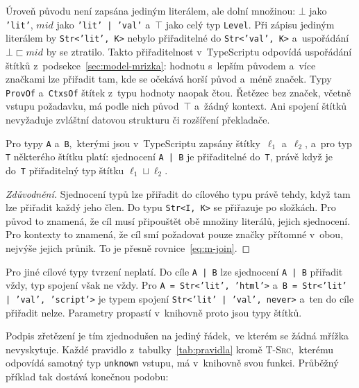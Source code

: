 \noindent
Úroveň původu není zapsána jediným literálem, ale dolní množinou: $\bot$ jako \texttt{'lit'}, $\mathit{mid}$ jako \texttt{'lit' | 'val'} a~$\top$ jako celý typ \texttt{Level}. Při zápisu jediným literálem by \texttt{Str<'lit', K>} nebylo přiřaditelné do \texttt{Str<'val', K>} a~uspořádání $\bot \sqsubset \mathit{mid}$ by se ztratilo. Takto přiřaditelnost v~TypeScriptu odpovídá uspořádání štítků z~podsekce~\ref{sec:model-mrizka}: hodnotu s~lepším původem a~více značkami lze přiřadit tam, kde se očekává horší původ a~méně značek. Typy \texttt{ProvOf} a~\texttt{CtxsOf} štítek z~typu hodnoty naopak čtou. Řetězec bez značek, včetně vstupu požadavku, má podle nich původ~$\top$ a~žádný kontext. Ani spojení štítků nevyžaduje zvláštní datovou strukturu či rozšíření překladače.

\begin{tvrzeni}
\label{claim:join}
Pro typy \texttt{A} a~\texttt{B},~kterými jsou v~TypeScriptu zapsány štítky~$\ell_1$ a~$\ell_2$, a~pro typ \texttt{T} některého štítku platí: sjednocení \texttt{A | B} je přiřaditelné do~\texttt{T}, právě když je do~\texttt{T} přiřaditelný typ štítku $\ell_1 \sqcup \ell_2$.
\end{tvrzeni}

\begin{proof}[Zdůvodnění]
Sjednocení typů lze přiřadit do cílového typu právě tehdy, když tam lze přiřadit každý jeho člen. Do typu \texttt{Str<I, K>} se přiřazuje po složkách. Pro původ to znamená, že cíl musí připouštět obě množiny literálů, jejich sjednocení. Pro kontexty to znamená, že cíl smí požadovat pouze značky přítomné v~obou, nejvýše jejich průnik. To je přesně rovnice~\ref{eq:m-join}.
\end{proof}

Pro jiné cílové typy tvrzení neplatí. Do cíle \texttt{A | B} lze sjednocení \texttt{A | B} přiřadit vždy, typ spojení však ne vždy. Pro \texttt{A = Str<'lit', 'html'>} a~\texttt{B = Str<'lit' | 'val', 'script'>} je typem spojení \texttt{Str<'lit' | 'val', never>} a~ten do cíle přiřadit nelze. Parametry propastí v~knihovně proto jsou typy štítků.

Podpis zřetězení je tím zjednodušen na jediný řádek,~ve kterém se žádná mřížka nevyskytuje. Každé pravidlo z~tabulky~\ref{tab:pravidla} kromě \textsc{T-Src},~kterému odpovídá samotný typ \texttt{unknown} vstupu, má v~knihovně svou funkci. Průběžný příklad tak dostává konečnou podobu:

